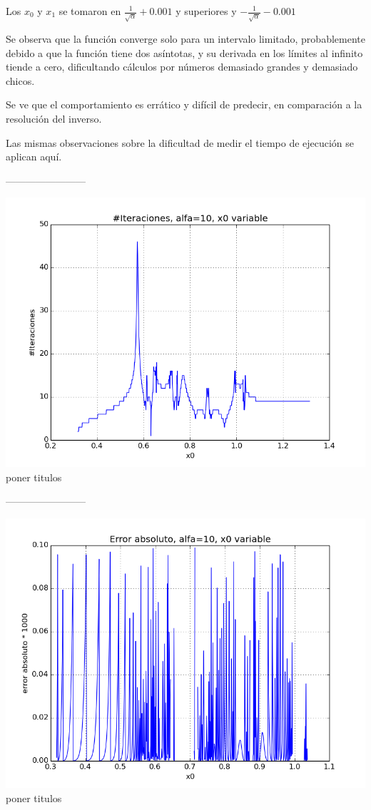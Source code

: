 Los $x_0$ y $x_1$ se tomaron en $\frac{1}{\sqrt{\alpha}} + 0.001$ y superiores y $-\frac{1}{\sqrt{\alpha}} - 0.001$

Se observa que la función converge solo para un intervalo limitado, probablemente debido a que la función tiene dos asíntotas, y su derivada en los límites al infinito tiende a cero, dificultando cálculos por números demasiado grandes y demasiado chicos.

Se ve que el comportamiento es errático y difícil de predecir, en comparación a la resolución del inverso.

Las mismas observaciones sobre la dificultad de medir el tiempo de ejecución se aplican aquí.


------------------------
\begin{center}
\includegraphics[scale=0.5]{graficos/iteraciones-e-secante-alfa_fijo-absoluto-0.0001-alejando.png}\\
poner titulos
\end{center}
------------------------
\begin{center}
\includegraphics[scale=0.5]{graficos/x0s-e-secante-alfa_fijo-absoluto-0.0001-alejando.png}\\
poner titulos
\end{center}
